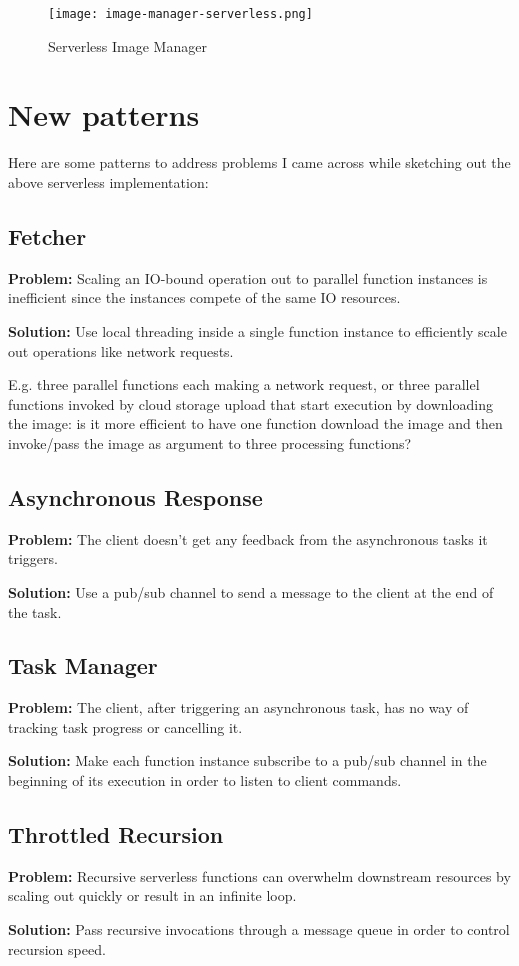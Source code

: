 \begin{figure}[h]
  \centering
  \texttt{[image: image-manager-serverless.png]}
  \caption{Serverless Image Manager}
  \label{fig:serverlessImageManager}
\end{figure}

\section{New patterns} \label{sec:newPatterns}

Here are some patterns to address problems I came across while sketching out the above serverless implementation:

\subsection{Fetcher} \label{subsec:Fetcher}

\textbf{Problem:} Scaling an IO-bound operation out to parallel function instances is inefficient since the instances compete of the same IO resources.

\textbf{Solution:} Use local threading inside a single function instance to efficiently scale out operations like network requests.

E.g. three parallel functions each making a network request, or three parallel functions invoked by cloud storage upload that start execution by downloading the image: is it more efficient to have one function download the image and then invoke/pass the image as argument to three processing functions?

\subsection{Asynchronous Response} \label{subsec:AsyncResponse}

\textbf{Problem:} The client doesn't get any feedback from the asynchronous tasks it triggers.

\textbf{Solution:} Use a pub/sub channel to send a message to the client at the end of the task.

\subsection{Task Manager} \label{subsec:taskManager}

\textbf{Problem:} The client, after triggering an asynchronous task, has no way of tracking task progress or cancelling it.

\textbf{Solution:} Make each function instance subscribe to a pub/sub channel in the beginning of its execution in order to listen to client commands.

\subsection{Throttled Recursion} \label{subsec:throttledRecursion}

\textbf{Problem:} Recursive serverless functions can overwhelm downstream resources by scaling out quickly or result in an infinite loop.

\textbf{Solution:} Pass recursive invocations through a message queue in order to control recursion speed.
